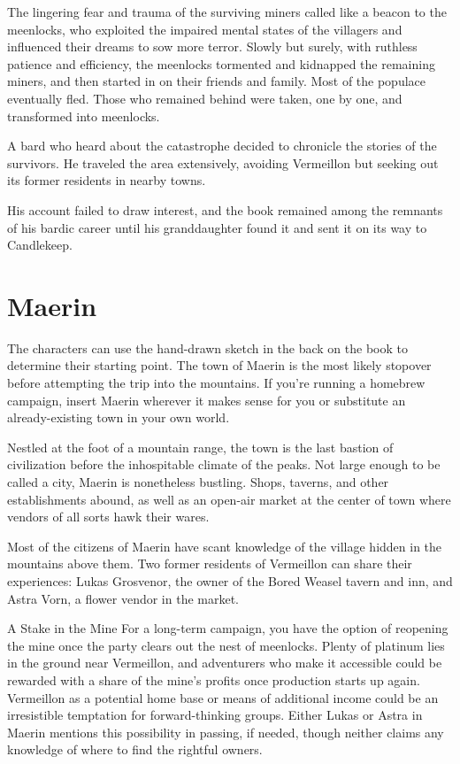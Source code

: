 \documentclass[10pt,a4paper,twoside,bg=print,twocolumn,openany,nodeprecatedcode]{dndbook}
\begin{document}
The lingering fear and trauma of the surviving miners called like a beacon to the meenlocks, who exploited the impaired mental states of the villagers and influenced their dreams to sow more terror. Slowly but surely, with ruthless patience and efficiency, the meenlocks tormented and kidnapped the remaining miners, and then started in on their friends and family. Most of the populace eventually fled. Those who remained behind were taken, one by one, and transformed into meenlocks.

A bard who heard about the catastrophe decided to chronicle the stories of the survivors. He traveled the area extensively, avoiding Vermeillon but seeking out its former residents in nearby towns.

His account failed to draw interest, and the book remained among the remnants of his bardic career until his granddaughter found it and sent it on its way to Candlekeep.

\section{Maerin}
The characters can use the hand-drawn sketch in the back on the book to determine their starting point. The town of Maerin is the most likely stopover before attempting the trip into the mountains. If you're running a homebrew campaign, insert Maerin wherever it makes sense for you or substitute an already-existing town in your own world.

Nestled at the foot of a mountain range, the town is the last bastion of civilization before the inhospitable climate of the peaks. Not large enough to be called a city, Maerin is nonetheless bustling. Shops, taverns, and other establishments abound, as well as an open-air market at the center of town where vendors of all sorts hawk their wares.

Most of the citizens of Maerin have scant knowledge of the village hidden in the mountains above them. Two former residents of Vermeillon can share their experiences: Lukas Grosvenor, the owner of the Bored Weasel tavern and inn, and Astra Vorn, a flower vendor in the market.

\begin{DndSidebar}[float=!b]{A Stake in the Mine}
For a long-term campaign, you have the option of reopening the mine once the party clears out the nest of meenlocks. Plenty of platinum lies in the ground near Vermeillon, and adventurers who make it accessible could be rewarded with a share of the mine's profits once production starts up again. Vermeillon as a potential home base or means of additional income could be an irresistible temptation for forward-thinking groups. Either Lukas or Astra in Maerin mentions this possibility in passing, if needed, though neither claims any knowledge of where to find the rightful owners.



\end{DndSidebar}
\end{document}
